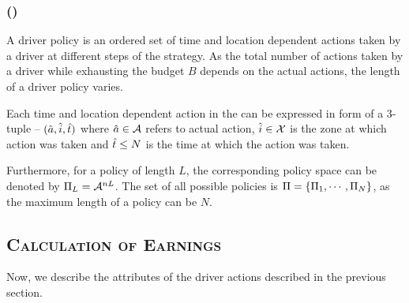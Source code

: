 \subsubsection{ (\policy)}

A driver policy is an ordered set of time and location dependent actions taken by a driver at different steps of the strategy. As the total number of actions taken by a driver while exhausting the budget $B$ depends on the actual actions, the length
of a driver policy {\policy} varies. 

Each time and location dependent action in the {\policy} can be expressed in form of a 3-tuple -- $(\hat{a}, \hat{i}, \hat{t})$
where $\hat{a} \in \mathcal{A}$ refers to actual action, $\hat{i} \in \mathcal{X}$ is the zone at which action was taken and $\hat{t} \leq N$ is the 
time at which the action was taken.



Furthermore, for a policy of length $L$, the corresponding policy space can be denoted by
$\Pi_L = \mathcal{A}^{nL}$. The set of all possible policies is $\Pi = \{\Pi_1, \cdots, \Pi_N\}$, as the maximum length of a policy can be $N$.


\subsection{\textsc{Calculation of Earnings}}
Now, we describe the attributes of the driver actions described in the previous section.

\subsubsection{}

